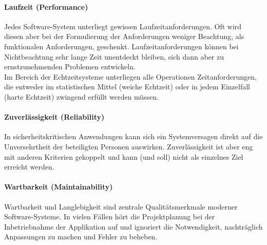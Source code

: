 \paragraph{Laufzeit (Performance)} Jedes Software-System unterliegt gewissen Laufzeitanforderungen. Oft wird diesen aber bei der Formulierung der Anforderungen weniger Beachtung, als funktionalen Anforderungen, geschenkt. Laufzeitanforderungen können bei Nichtbeachtung sehr lange Zeit unentdeckt bleiben, sich dann aber zu ernstzunehmenden Problemen entwickeln.\\
Im Bereich der Echtzeitsysteme unterliegen alle Operationen Zeitanforderungen, die entweder im statistischen Mittel (weiche Echtzeit) oder in jedem Einzelfall (harte Echtzeit) zwingend erfüllt werden müssen. \cite{hoffmann_software-qualitat_2013}

\paragraph{Zuverlässigkeit (Reliability)} In sicherheitskritischen Anwendungen kann sich ein Systemversagen direkt auf die Unversehrtheit der beteiligten Personen auswirken. Zuverlässigkeit ist aber eng mit anderen Kriterien gekoppelt und kann (und soll) nicht als einzelnes Ziel erreicht werden.

\paragraph{Wartbarkeit (Maintainability)} Wartbarkeit und Langlebigkeit sind zentrale Qualitätsmerkmale moderner Software-Systeme. \cite{rombach_design_2009} In vielen Fällen hört die Projektplanung bei der Inbetriebnahme der Applikation auf und ignoriert die Notwendigkeit, nachträglich Anpassungen zu machen und Fehler zu beheben.

